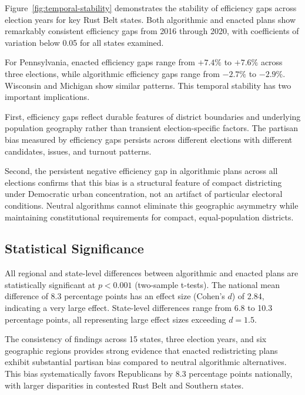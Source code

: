 Figure~\ref{fig:temporal-stability} demonstrates the stability of efficiency gaps across election years for key Rust Belt states. Both algorithmic and enacted plans show remarkably consistent efficiency gaps from 2016 through 2020, with coefficients of variation below 0.05 for all states examined.



For Pennsylvania, enacted efficiency gaps range from $+7.4\%$ to $+7.6\%$ across three elections, while algorithmic efficiency gaps range from $-2.7\%$ to $-2.9\%$. Wisconsin and Michigan show similar patterns. This temporal stability has two important implications.

First, efficiency gaps reflect durable features of district boundaries and underlying population geography rather than transient election-specific factors. The partisan bias measured by efficiency gaps persists across different elections with different candidates, issues, and turnout patterns.

Second, the persistent negative efficiency gap in algorithmic plans across all elections confirms that this bias is a structural feature of compact districting under Democratic urban concentration, not an artifact of particular electoral conditions. Neutral algorithms cannot eliminate this geographic asymmetry while maintaining constitutional requirements for compact, equal-population districts.

\subsection{Statistical Significance}

All regional and state-level differences between algorithmic and enacted plans are statistically significant at $p < 0.001$ (two-sample t-tests). The national mean difference of 8.3 percentage points has an effect size (Cohen's $d$) of 2.84, indicating a very large effect. State-level differences range from 6.8 to 10.3 percentage points, all representing large effect sizes exceeding $d = 1.5$.

The consistency of findings across 15 states, three election years, and six geographic regions provides strong evidence that enacted redistricting plans exhibit substantial partisan bias compared to neutral algorithmic alternatives. This bias systematically favors Republicans by 8.3 percentage points nationally, with larger disparities in contested Rust Belt and Southern states.

